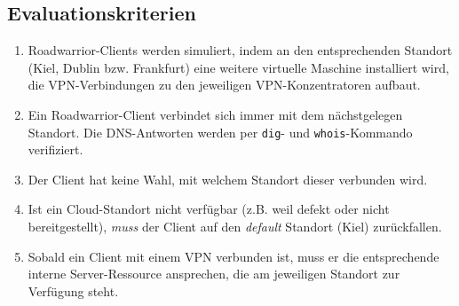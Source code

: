 \subsection{Evaluationskriterien}\label{eval-roadwarrior}
\begin{enumerate}
\item Roadwarrior-Clients werden simuliert, indem an den entsprechenden Standort (Kiel, Dublin bzw. Frankfurt) eine weitere virtuelle Maschine installiert wird, die VPN-Verbindungen zu den jeweiligen VPN-Konzentratoren aufbaut.
\item Ein Roadwarrior-Client verbindet sich immer mit dem nächstgelegen Standort. Die DNS-Antworten werden per \texttt{dig}- und \texttt{whois}-Kommando verifiziert.
\item Der Client hat keine Wahl, mit welchem Standort dieser verbunden wird.
\item Ist ein Cloud-Standort nicht verfügbar (z.B. weil defekt oder nicht bereitgestellt), \textit{muss} der Client auf den \textit{default} Standort (Kiel) zurückfallen.
\item Sobald ein Client mit einem VPN verbunden ist, muss er die entsprechende interne Server-Ressource ansprechen, die am jeweiligen Standort zur Verfügung steht.
\end{enumerate}
